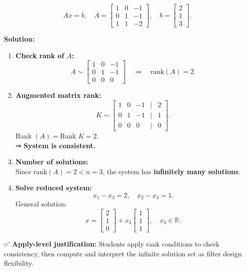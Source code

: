\documentclass[
  letterpaper,
  DIV=11,
  numbers=noendperiod]{scrreprt}
\begin{document}
\[
Ax = b, \quad 
A = \begin{bmatrix}
1 & 0 & -1 \\
0 & 1 & -1 \\
1 & 1 & -2
\end{bmatrix}, \quad 
b = \begin{bmatrix} 2 \\ 1 \\ 3 \end{bmatrix}.
\]

\textbf{Solution:}

\begin{enumerate}
\def\labelenumi{\arabic{enumi}.}
\item
  \textbf{Check rank of \(A\):} \[
  A \sim 
  \begin{bmatrix}
  1 & 0 & -1 \\
  0 & 1 & -1 \\
  0 & 0 & 0
  \end{bmatrix}
  \quad \Rightarrow \quad \text{rank}(A)=2.
  \]
\item
  \textbf{Augmented matrix rank:} \[
  K \sim 
  \begin{bmatrix}
  1 & 0 & -1 & | & 2 \\
  0 & 1 & -1 & | & 1 \\
  0 & 0 & 0 & | & 0
  \end{bmatrix}.
  \] Rank \((A)=\)Rank \(K=2\).\\
  ⇒ \textbf{System is consistent.}
\item
  \textbf{Number of solutions:}\\
  Since \(\text{rank}(A)=2 < n=3\), the system has \textbf{infinitely
  many solutions}.
\item
  \textbf{Solve reduced system:}\\
  \[
  x_1 - x_3 = 2, \quad x_2 - x_3 = 1.
  \] General solution: \[
  x = \begin{bmatrix} 2 \\ 1 \\ 0 \end{bmatrix} + x_3 \begin{bmatrix} 1 \\ 1 \\ 1 \end{bmatrix}, 
  \quad x_3 \in \mathbb{R}.
  \]
\end{enumerate}

✅ \textbf{Apply-level justification:} Students apply rank conditions to
check consistency, then compute and interpret the infinite solution set
as filter design flexibility.
\end{document}
